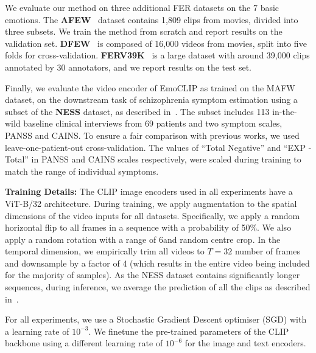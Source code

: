 \documentclass[10pt,twocolumn,letterpaper]{article}
\begin{document}
We evaluate our method on three additional FER datasets on the 7 basic emotions. The \textbf{AFEW}~\cite{afew} dataset contains 1,809 clips from movies, divided into three subsets. We train the method from scratch and report results on the validation set. \textbf{DFEW}~\cite{dfew} is composed of 16,000 videos from movies, split into five folds for cross-validation. \textbf{FERV39K}~\cite{ferv39k} is a large dataset with around 39,000 clips annotated by 30 annotators, and we report results on the test set. 



Finally, we evaluate the video encoder of EmoCLIP as trained on the MAFW dataset, on the downstream task of schizophrenia symptom estimation using a subset of the \textbf{NESS}\cite{ness} dataset, as described in~\cite{bishay2019schinet, foteinopoulou_learning_2022}. The subset includes 113 in-the-wild baseline clinical interviews from 69 patients and two symptom scales, PANSS\cite{kay_positive_1987} and CAINS\cite{forbes_initial_2010}. To ensure a fair comparison with previous works, we used leave-one-patient-out cross-validation. The values of ``Total Negative'' and ``EXP - Total'' in PANSS and CAINS scales respectively, were scaled during training to match the range of individual symptoms.

\textbf{Training Details:} The CLIP image encoders used in all experiments have a ViT-B/32 architecture. During training, we apply augmentation to the spatial dimensions of the video inputs for all datasets. Specifically, we apply a random horizontal flip to all frames in a sequence with a probability of 50\%. We also apply a random rotation with a range of 6\textdegree and random centre crop. 
In the temporal dimension, we empirically trim all videos to $T=32$ number of frames and downsample by a factor of 4 (which results in the entire video being included for the majority of samples). As the NESS dataset contains significantly longer sequences, during inference, we average the prediction of all the clips as described in~\cite{foteinopoulou_learning_2022}.

For all experiments, we use a Stochastic Gradient Descent optimiser (SGD) with a learning rate of $10^{-3}$. We finetune the pre-trained parameters of the CLIP backbone using a different learning rate of $10^{-6}$ for the image and text encoders.
\end{document}
